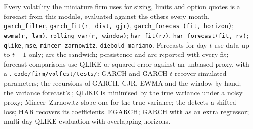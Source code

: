 \begin{build}
 Every volatility the miniature firm uses for sizing, limits and option quotes is a forecast from this module, evaluated against the others
every month.
 \texttt{garch\_filter}, \texttt{garch\_fit(r, dist, gjr)}, \texttt{garch\_forecast(fit, horizon)}; \texttt{ewma(r, lam)}, \texttt{rolling\_var(r,
window)}; \texttt{har\_fit(rv)}, \texttt{har\_forecast(fit, rv)}; \texttt{qlike}, \texttt{mse}, \texttt{mincer\_zarnowitz}, \texttt{diebold\_mariano}.
 Forecasts for day $t$ use data up to $t - 1$ only;  are the sandwich; persistence and  are reported with every fit; forecast
comparisons use QLIKE or squared error against an unbiased proxy, with a .
 \texttt{code/firm/volfcst/tests/}: GARCH and GARCH-$t$ recover simulated parameters; the recursions of GARCH, GJR, EWMA and the window
by hand; the variance forecast's ; QLIKE is minimised by the true variance under a noisy proxy; Mincer--Zarnowitz slope one for the true
variance; the  detects a shifted loss; HAR recovers its coefficients.
 EGARCH; GARCH with  as an extra regressor; multi-day QLIKE evaluation with overlapping horizons.
\end{build}

